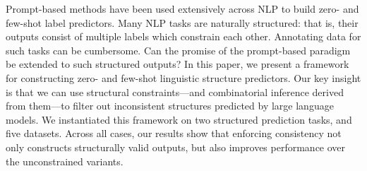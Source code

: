 Prompt-based methods have been used extensively across NLP to build zero- and few-shot label predictors. Many NLP tasks are naturally structured: that is, their outputs consist of multiple labels which constrain each other.  Annotating data for such tasks can be cumbersome. Can the promise of the prompt-based paradigm be extended to such structured outputs? In this paper, we present a framework for constructing zero- and few-shot linguistic structure predictors. Our key insight is that we can use structural constraints---and combinatorial inference derived from them---to filter out inconsistent structures predicted by large language models.  We instantiated this framework on two structured prediction tasks, and five datasets. Across all cases, our results show that enforcing consistency not only constructs structurally valid outputs, but also improves performance over the unconstrained variants.